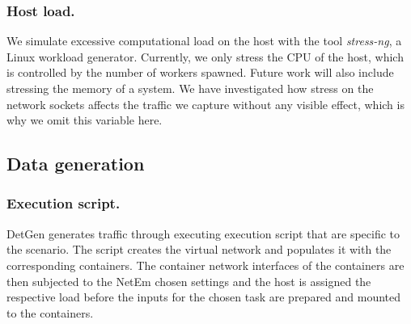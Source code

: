 

\subsubsection{Host load.}

We simulate excessive computational load on the host with the tool \emph{stress-ng}, a Linux workload generator. Currently, we only stress the CPU of the host, which is controlled by the number of workers spawned. Future work will also include stressing the memory of a system. We have investigated how stress on the network sockets affects the traffic we capture without any visible effect, which is why we omit this variable here. 

\subsection{Data generation}

\subsubsection*{Execution script.}

DetGen generates traffic through executing execution script that are specific to the scenario. The script creates the virtual network and populates it with the corresponding containers. The container network interfaces of the containers are then subjected to the NetEm chosen settings and the host is assigned the respective load before the inputs for the chosen task are prepared and mounted to the containers. 

